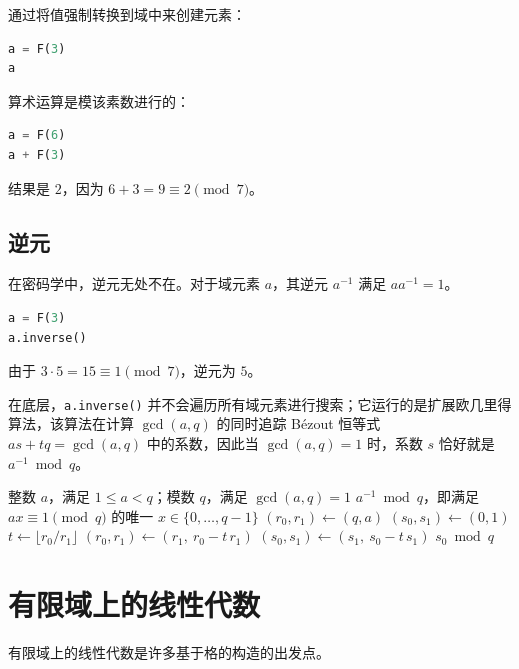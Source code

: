 通过将值强制转换到域中来创建元素：

\begin{lstlisting}[language=Python]
a = F(3)
a
\end{lstlisting}

算术运算是模该素数进行的：

\begin{lstlisting}[language=Python]
a = F(6)
a + F(3)
\end{lstlisting}

结果是 $2$，因为 $6 + 3 = 9 \equiv 2 \pmod{7}$。

\subsection{逆元}
在密码学中，逆元无处不在。对于域元素 $a$，其逆元 $a^{-1}$ 满足 $a a^{-1} = 1$。

\begin{lstlisting}[language=Python]
a = F(3)
a.inverse()
\end{lstlisting}

由于 $3 \cdot 5 = 15 \equiv 1 \pmod{7}$，逆元为 $5$。

在底层，\texttt{a.inverse()} 并不会遍历所有域元素进行搜索；它运行的是扩展欧几里得算法，该算法在计算 $\gcd(a,q)$ 的同时追踪 Bézout 恒等式 $as+tq=\gcd(a,q)$ 中的系数，因此当 $\gcd(a,q)=1$ 时，系数 $s$ 恰好就是 $a^{-1} \bmod q$。

\begin{algorithm}[H]
\caption{求模逆元的扩展欧几里得算法}
\label{alg:ext-euclid}
\begin{algorithmic}[1]
\Require 整数 $a$，满足 $1 \le a < q$；模数 $q$，满足 $\gcd(a,q)=1$
\Ensure $a^{-1} \bmod q$，即满足 $ax \equiv 1 \pmod{q}$ 的唯一 $x \in \{0,\dots,q-1\}$
\State $(r_0, r_1) \gets (q, a)$
\State $(s_0, s_1) \gets (0, 1)$ 
    \State $t \gets \lfloor r_0 / r_1 \rfloor$
    \State $(r_0, r_1) \gets (r_1,\ r_0 - t\, r_1)$
    \State $(s_0, s_1) \gets (s_1,\ s_0 - t\, s_1)$
\EndWhile
\State \Return $s_0 \bmod q$ 
\end{algorithmic}
\end{algorithm}

\section{有限域上的线性代数}
有限域上的线性代数是许多基于格的构造的出发点。

